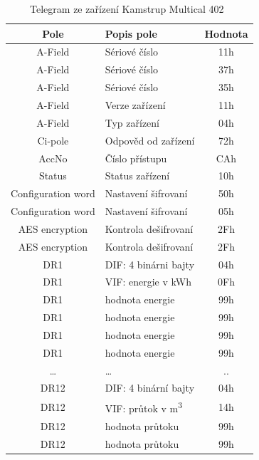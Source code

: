 \begin{table}[!ht]
\centering
\caption{Telegram ze zařízení Kamstrup Multical 402~\cite{CidloKamstrup}}
\label{TabulkaTelegramKamstrup}
\begin{tabular}{|c|l|c|}
\hline
\textbf{Pole}      & \textbf{Popis pole}            & \textbf{Hodnota} \\ \hline \hline
A-Field            & Sériové číslo         & 11h \\ \hline
A-Field            & Sériové číslo         & 37h \\ \hline
A-Field            & Sériové číslo         & 35h \\ \hline
A-Field            & Verze zařízení        & 11h \\ \hline
A-Field            & Typ zařízení          & 04h \\ \hline
Ci-pole            & Odpověd od zařízení   & 72h \\ \hline
AccNo              & Číslo přístupu        & CAh \\ \hline
Status             & Status zařízení       & 10h \\ \hline
Configuration word & Nastavení šifrovaní & 50h \\ \hline
Configuration word & Nastavení šifrovaní & 05h \\ \hline
AES encryption     & Kontrola dešifrovaní & 2Fh \\ \hline
AES encryption     & Kontrola dešifrovaní & 2Fh \\ \hline
DR1                & DIF: 4 binárni bajty   & 04h \\ \hline
DR1                & VIF: energie v kWh    & 0Fh \\ \hline
DR1                & hodnota energie       & 99h \\ \hline
DR1                & hodnota energie       & 99h \\ \hline
DR1                & hodnota energie       & 99h \\ \hline
DR1                & hodnota energie       & 99h \\ \hline
…                  & …                     & ..  \\ \hline
DR12               & DIF: 4 binární bajty   & 04h \\ \hline
DR12               & VIF: průtok v m\textsuperscript{3}      & 14h \\ \hline
DR12               & hodnota průtoku       & 99h \\ \hline
DR12               & hodnota průtoku       & 99h \\ \hline

\end{tabular}
\end{table}

